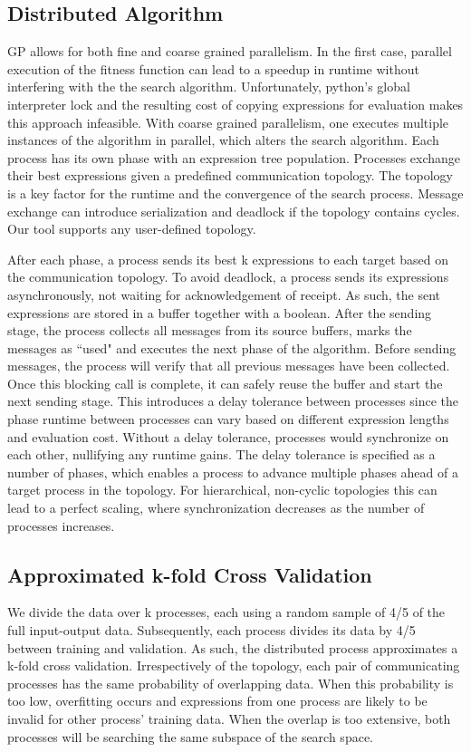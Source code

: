\subsection{Distributed Algorithm}
GP allows for both fine and coarse grained parallelism. In the first case, parallel execution of the fitness function can lead to a speedup in runtime without interfering with the the search algorithm. Unfortunately, python's global interpreter lock and the resulting cost of copying expressions for evaluation makes this approach infeasible. With coarse grained parallelism, one executes multiple instances of the algorithm in parallel, which alters the search algorithm. Each process has its own phase with an expression tree population. Processes exchange their best expressions given a predefined communication topology. The topology is a key factor for the runtime and the convergence of the search process. Message exchange can introduce serialization and deadlock if the topology contains cycles. Our tool supports any user-defined topology. 

After each phase, a process sends its best k expressions to each target based on the communication topology. To avoid deadlock, a process sends its expressions asynchronously, not waiting for acknowledgement of receipt. As such, the sent expressions are stored in a buffer together with a boolean. After the sending stage, the process collects all messages from its source buffers, marks the messages as ``used" and executes the next phase of the algorithm. Before sending messages, the process will verify that all previous messages have been collected. Once this blocking call is complete, it can safely reuse the buffer and start the next sending stage. This introduces a delay tolerance between processes since the phase runtime between processes can vary based on different expression lengths and evaluation cost. Without a delay tolerance, processes would synchronize on each other, nullifying any runtime gains. The delay tolerance is specified as a number of phases, which enables a process to advance multiple phases ahead of a target process in the topology. 
For hierarchical, non-cyclic topologies this can lead to a perfect scaling, where synchronization decreases as the number of processes increases.

\subsection{Approximated k-fold Cross Validation}
We divide the data over k processes, each using a random sample of 4/5 of the full input-output data. Subsequently, each process divides its data by 4/5 between training and validation. As such, the distributed process approximates a k-fold cross validation. Irrespectively of the topology, each pair of communicating processes has the same probability of overlapping data. When this probability is too low, overfitting occurs and expressions from one process are likely to be invalid for other process' training data. When the overlap is too extensive, both processes will be searching the same subspace of the search space.

